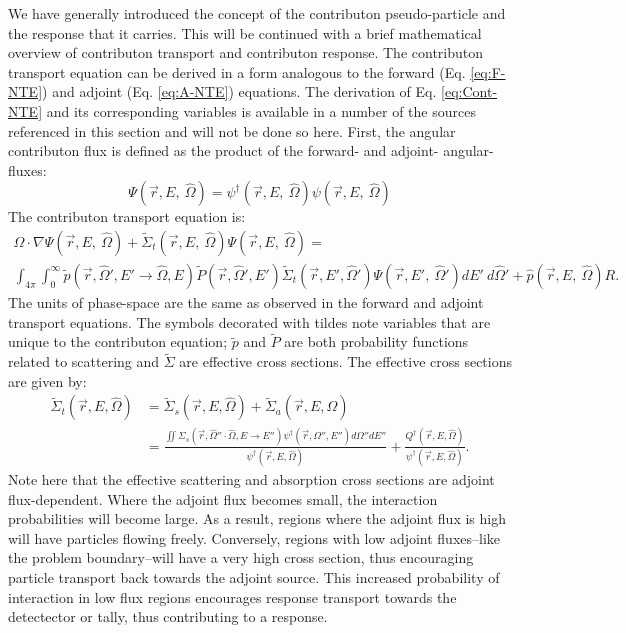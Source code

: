 We have generally introduced the concept of the contributon pseudo-particle and
the response that it carries. This will be continued with a brief mathematical
overview of contributon transport and contributon response.
The contributon transport equation can be derived in a form analogous
to the forward (Eq. \ref{eq:F-NTE}) and adjoint (Eq. \ref{eq:A-NTE}) equations.
The derivation of Eq. \ref{eq:Cont-NTE} and its corresponding variables is
available in a number of the sources referenced in this section and will not be
done so here. First, the angular contributon flux is defined
as the product of the forward- and
adjoint- angular- fluxes:
\begin{equation}
\Psi (\vec {r} ,E,\:\hat\Omega) = \psi^{\dagger} (\vec {r} ,E,\:\hat\Omega)
        \psi(\vec {r} ,E,\:\hat\Omega)
\label{eq.Cont-Flux}
\end{equation}
The contributon transport equation is:
\begin{multline}
\hat\Omega \cdot \nabla \Psi (\vec {r} ,E,\:\hat\Omega)
+\widetilde{\Sigma} _{ t }(\vec{r},E,\:\hat\Omega)\Psi (\vec { r } ,E,\:\hat\Omega)
     = \\
        \int _{ 4\pi  } \int _{ 0 }^{ \infty  }
        \widetilde{p}(\vec{r}, \hat\Omega', E'\rightarrow\hat\Omega, E)
        \widetilde{P}(\vec{r}, \hat\Omega',E')
        \widetilde{\Sigma} _{ t }(\vec{r}, E', \hat\Omega')
        \Psi (\vec { r } ,E',\: \hat\Omega')dE' \:d\hat\Omega'
        + \hat p(\vec { r } ,E, \:\hat\Omega) R .
\label{eq:Cont-NTE}
\end{multline}
The units of phase-space are the same as observed in the forward and adjoint
transport equations. The symbols decorated with tildes note variables that are
unique to the contributon equation; $\widetilde{p}$ and $\widetilde{P}$ are both
probability functions related to scattering and $\widetilde{\Sigma}$ are
effective cross sections.
The effective cross sections are given by:
\begin{equation}
\begin{aligned}
\widetilde{\Sigma}_{t}(\vec{r}, E, \hat\Omega) &=
        \widetilde{\Sigma}_{s}(\vec{r}, E, \hat\Omega) +
        \widetilde{\Sigma}_{a}(\vec{r}, E, \hat\Omega)    \\
     &= \frac{\iint \Sigma_{s}(\vec{r},\hat\Omega''\cdot\hat\Omega,
         E\rightarrow E'') \psi^{\dagger}
         (\vec{r}, \Omega'', E'') d\Omega'' dE''}
         {\psi^{\dagger}(\vec{r}, E, \hat\Omega)}
        + \frac{Q^{\dagger}(\vec{r}, E, \hat\Omega)}
        {\psi^{\dagger}(\vec{r}, E, \hat\Omega)}.
\end{aligned}
\end{equation}
Note here that the effective scattering and absorption cross sections are
adjoint flux-dependent. Where the adjoint flux becomes small, the interaction
probabilities will become large. As a result, regions where the adjoint flux
is high will have particles flowing freely. Conversely, regions with low adjoint
fluxes--like the problem boundary--will have a very high cross section, thus
encouraging particle transport back towards the adjoint source. This
increased probability of interaction in low flux regions encourages response
transport towards the detectector or tally, thus contributing to a response.

